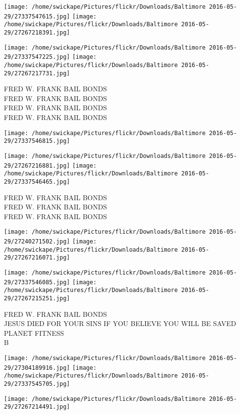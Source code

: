 \documentclass[10pt,letterpaper]{article}
\begin{document}
\texttt{[image: /home/swickape/Pictures/flickr/Downloads/Baltimore 2016-05-29/27337547615.jpg]}
\texttt{[image: /home/swickape/Pictures/flickr/Downloads/Baltimore 2016-05-29/27267218391.jpg]}

\texttt{[image: /home/swickape/Pictures/flickr/Downloads/Baltimore 2016-05-29/27337547225.jpg]}
\texttt{[image: /home/swickape/Pictures/flickr/Downloads/Baltimore 2016-05-29/27267217731.jpg]}

FRED W. FRANK BAIL BONDS\\
FRED W. FRANK BAIL BONDS\\
FRED W. FRANK BAIL BONDS\\
FRED W. FRANK BAIL BONDS
\pagebreak

\texttt{[image: /home/swickape/Pictures/flickr/Downloads/Baltimore 2016-05-29/27337546815.jpg]}

\vspace{0.25in}
\texttt{[image: /home/swickape/Pictures/flickr/Downloads/Baltimore 2016-05-29/27267216881.jpg]}
\texttt{[image: /home/swickape/Pictures/flickr/Downloads/Baltimore 2016-05-29/27337546465.jpg]}

FRED W. FRANK BAIL BONDS\\
FRED W. FRANK BAIL BONDS\\
FRED W. FRANK BAIL BONDS
\pagebreak

\texttt{[image: /home/swickape/Pictures/flickr/Downloads/Baltimore 2016-05-29/27240271502.jpg]}
\texttt{[image: /home/swickape/Pictures/flickr/Downloads/Baltimore 2016-05-29/27267216071.jpg]}

\texttt{[image: /home/swickape/Pictures/flickr/Downloads/Baltimore 2016-05-29/27337546085.jpg]}
\texttt{[image: /home/swickape/Pictures/flickr/Downloads/Baltimore 2016-05-29/27267215251.jpg]}

FRED W. FRANK BAIL BONDS\\
JESUS DIED FOR YOUR SINS IF YOU BELIEVE YOU WILL BE SAVED\\
PLANET FITNESS\\
B
\pagebreak

\texttt{[image: /home/swickape/Pictures/flickr/Downloads/Baltimore 2016-05-29/27304189916.jpg]}
\texttt{[image: /home/swickape/Pictures/flickr/Downloads/Baltimore 2016-05-29/27337545705.jpg]}

\vspace{0.25in}
\texttt{[image: /home/swickape/Pictures/flickr/Downloads/Baltimore 2016-05-29/27267214491.jpg]}
\end{document}
